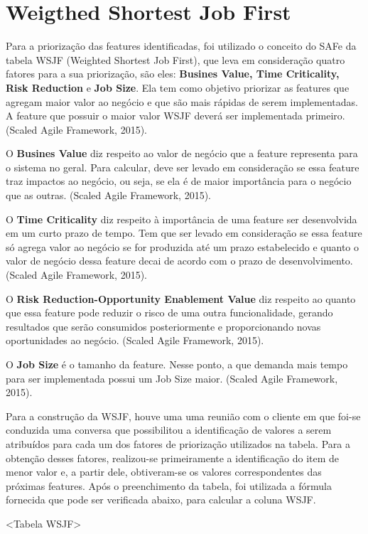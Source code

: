 \section{Weigthed Shortest Job First}
	
	Para a priorização das features identificadas, foi utilizado o conceito do SAFe da tabela WSJF (Weighted Shortest Job First), que leva em consideração quatro fatores para a sua priorização, são eles: \textbf{Busines Value, Time Criticality, Risk Reduction} e \textbf{Job Size}.  Ela tem como objetivo priorizar as features que agregam maior valor ao negócio e que são mais rápidas de serem implementadas. A feature que possuir o maior valor WSJF deverá ser implementada primeiro. (Scaled Agile Framework, 2015).

	O \textbf{Busines Value} diz respeito ao valor de negócio que a feature representa para o sistema no geral. Para calcular, deve ser levado em consideração se essa feature traz impactos ao negócio, ou seja, se ela é de maior importância para o negócio que as outras. (Scaled Agile Framework, 2015).

	O \textbf{Time Criticality} diz respeito à importância de uma feature ser desenvolvida em um curto prazo de tempo. Tem que ser levado em consideração se essa feature só agrega valor ao negócio se for produzida até um prazo estabelecido e quanto o valor de negócio dessa feature decai de acordo com o prazo de desenvolvimento. (Scaled Agile Framework, 2015).

	O \textbf{Risk Reduction-Opportunity Enablement Value} diz respeito ao quanto que essa feature pode reduzir o risco de uma outra funcionalidade, gerando resultados que serão consumidos posteriormente e proporcionando novas oportunidades ao negócio. (Scaled Agile Framework, 2015).

	O \textbf{Job Size} é o tamanho da feature. Nesse ponto, a que demanda mais tempo para ser implementada possui um Job Size maior. (Scaled Agile Framework, 2015).

	Para a construção da WSJF, houve uma uma reunião com o cliente em que foi-se conduzida uma conversa que possibilitou a identificação de valores a serem atribuídos para cada um dos fatores de priorização utilizados na tabela. Para a obtenção desses fatores, realizou-se primeiramente a identificação do item de menor valor e, a partir dele, obtiveram-se os valores correspondentes das próximas features. Após o preenchimento da tabela, foi utilizada a fórmula fornecida que pode ser verificada abaixo, para calcular a coluna WSJF.


	<Tabela WSJF>


